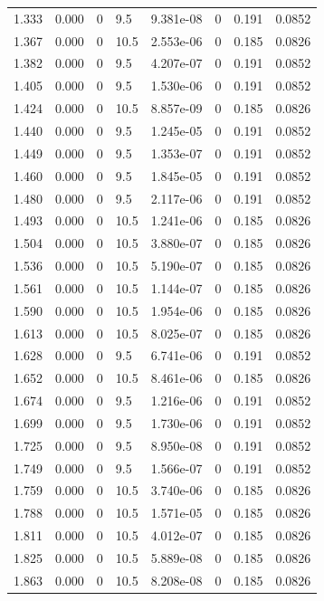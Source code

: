 \documentclass[preview]{standalone}
\begin{document}
{{{\begin{tabular}{L{1.2cm}C{1.2cm} C{0.3cm}C{0.5cm} C{1.4cm}C{1.4cm} C{1.4cm}C{1.4cm}}
  1.333  &  0.000  & 0     & 9.5 &  9.381e-08  & 0  & 0.191 &  0.0852   \\ 
  1.367  &  0.000  & 0     & 10.5 &  2.553e-06  & 0  & 0.185 &  0.0826   \\ 
  1.382  &  0.000  & 0     & 9.5 &  4.207e-07  & 0  & 0.191 &  0.0852   \\ 
  1.405  &  0.000  & 0     & 9.5 &  1.530e-06  & 0  & 0.191 &  0.0852   \\ 
  1.424  &  0.000  & 0     & 10.5 &  8.857e-09  & 0  & 0.185 &  0.0826   \\ 
  1.440  &  0.000  & 0     & 9.5 &  1.245e-05  & 0  & 0.191 &  0.0852   \\ 
  1.449  &  0.000  & 0     & 9.5 &  1.353e-07  & 0  & 0.191 &  0.0852   \\ 
  1.460  &  0.000  & 0     & 9.5 &  1.845e-05  & 0  & 0.191 &  0.0852   \\ 
  1.480  &  0.000  & 0     & 9.5 &  2.117e-06  & 0  & 0.191 &  0.0852   \\ 
  1.493  &  0.000  & 0     & 10.5 &  1.241e-06  & 0  & 0.185 &  0.0826   \\ 
  1.504  &  0.000  & 0     & 10.5 &  3.880e-07  & 0  & 0.185 &  0.0826   \\ 
  1.536  &  0.000  & 0     & 10.5 &  5.190e-07  & 0  & 0.185 &  0.0826   \\ 
  1.561  &  0.000  & 0     & 10.5 &  1.144e-07  & 0  & 0.185 &  0.0826   \\ 
  1.590  &  0.000  & 0     & 10.5 &  1.954e-06  & 0  & 0.185 &  0.0826   \\ 
  1.613  &  0.000  & 0     & 10.5 &  8.025e-07  & 0  & 0.185 &  0.0826   \\ 
  1.628  &  0.000  & 0     & 9.5 &  6.741e-06  & 0  & 0.191 &  0.0852   \\ 
  1.652  &  0.000  & 0     & 10.5 &  8.461e-06  & 0  & 0.185 &  0.0826   \\ 
  1.674  &  0.000  & 0     & 9.5 &  1.216e-06  & 0  & 0.191 &  0.0852   \\ 
  1.699  &  0.000  & 0     & 9.5 &  1.730e-06  & 0  & 0.191 &  0.0852   \\ 
  1.725  &  0.000  & 0     & 9.5 &  8.950e-08  & 0  & 0.191 &  0.0852   \\ 
  1.749  &  0.000  & 0     & 9.5 &  1.566e-07  & 0  & 0.191 &  0.0852   \\ 
  1.759  &  0.000  & 0     & 10.5 &  3.740e-06  & 0  & 0.185 &  0.0826   \\ 
  1.788  &  0.000  & 0     & 10.5 &  1.571e-05  & 0  & 0.185 &  0.0826   \\ 
  1.811  &  0.000  & 0     & 10.5 &  4.012e-07  & 0  & 0.185 &  0.0826   \\ 
  1.825  &  0.000  & 0     & 10.5 &  5.889e-08  & 0  & 0.185 &  0.0826   \\ 
  1.863  &  0.000  & 0     & 10.5 &  8.208e-08  & 0  & 0.185 &  0.0826   \\ 
\hline 
\end{tabular} 

}}}
\end{document}
